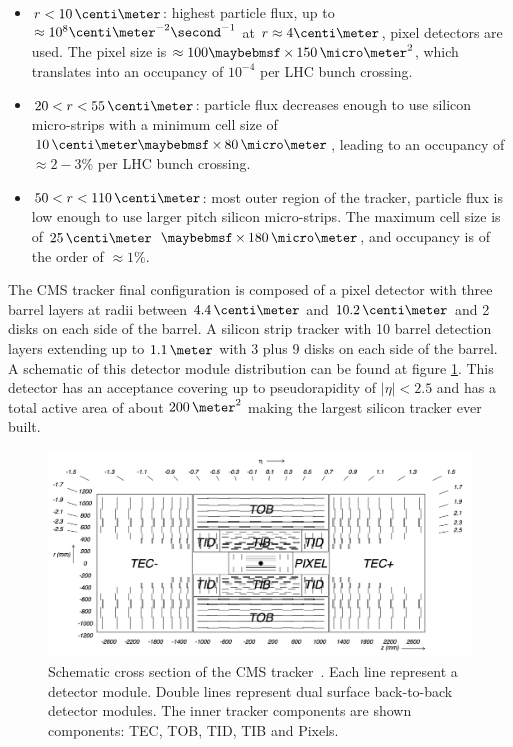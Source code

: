 \begin{itemize}
  \item $r<10\,\centi\meter$: highest particle flux, up to $\approx 10^8 \centi\meter^{-2}\second^{-1}$ at $r \approx 4 \centi\meter$, pixel detectors are used. The pixel size is $\approx 100 \times 150\,\micro\meter^2$, which translates into an occupancy of $10^{-4}$ per \gls{LHC} bunch crossing.
  \item $20<r<55\,\centi\meter$: particle flux decreases enough to use silicon micro-strips with a minimum cell size of $10\,\centi\meter \times 80\,\micro\meter$, leading to an occupancy of $\approx 2-3\%$ per \gls{LHC} bunch crossing.
  \item $50<r<110\,\centi\meter$: most outer region of the tracker, particle flux is low enough to use larger pitch silicon micro-strips. The maximum cell size is of $25\,\centi\meter$ $\times 180\,\micro\meter$, and occupancy is of the order of $\approx 1\%$.
\end{itemize}

The \gls{CMS} tracker final configuration is composed of a pixel detector with three barrel layers at radii between $4.4\,\centi\meter$ and $10.2\,\centi\meter$ and 2 disks on each side of the barrel. A silicon strip tracker with 10 barrel detection layers extending up to $1.1\,\meter$ with 3 plus 9 disks on each side of the barrel. A schematic of this detector module distribution can be found at figure \ref{FIGURE:ExperimentalApparatus_CMS_Tracker_Layout}. This detector has an acceptance covering up to pseudorapidity of $|\eta|<2.5$ and has a total active area of about $200\,\meter^2$ making the largest silicon tracker ever built. 

\begin{figure}[!htb]
  \centering
  \includegraphics[width=1.0\textwidth]{Chapter02/CMS/Images/CMS_Tracker_Layout.png}
  \caption{Schematic cross section of the CMS tracker~\cite{ARTICLE:TheCMSExperiment}. Each line represent a detector module. Double lines represent dual surface back-to-back detector modules. The inner tracker components are shown components: \gls{TEC}, \gls{TOB}, \gls{TID}, \gls{TIB} and Pixels. }
  \label{FIGURE:ExperimentalApparatus_CMS_Tracker_Layout}
\end{figure}

